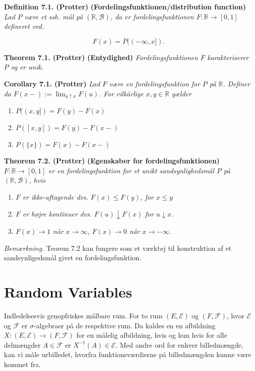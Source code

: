 \documentclass[
]{book}
\providecommand{\tightlist}{%
  \setlength{\itemsep}{0pt}\setlength{\parskip}{0pt}}
\begin{document}
\textbf{Definition 7.1. (Protter)} \textbf{(Fordelingsfunktionen/distribution function)} \emph{Lad \(P\) være et ssh. mål på \((\mathbb{R},\mathcal{B})\), da er fordelingsfunktionen \(F : \mathbb{R}\to [0,1]\) defineret ved.}

\[
F(x)=P((-\infty,x]).
\]

\textbf{Theorem 7.1. (Protter)} \textbf{(Entydighed)} \emph{Fordelingsfunktionen \(F\) karakteriserer \(P\) og er unik.}

\textbf{Corollary 7.1. (Protter)} \emph{Lad \(F\) være en fordelingsfunktion for \(P\) på \(\mathbb{R}\). Definer da \(F(x-):=\lim_{u\uparrow x}F(u)\). For vilkårlige \(x,y\in\mathbb{R}\) gælder}

\begin{enumerate}
\def\labelenumi{\roman{enumi}.}
\tightlist
\item
  \(P((x,y])=F(y)-F(x)\)
\item
  \(P([x,y])=F(y)-F(x-)\)
\item
  \(P(\{x\})=F(x)-F(x-)\)
\end{enumerate}

\textbf{Theorem 7.2. (Protter)} \textbf{(Egenskaber for fordelingsfunktionen)} \emph{\(F : \mathbb{R} \to [0,1]\) er en fordelingsfunktion for et unikt sandsynlighedsmål \(P\) på \((\mathbb{R},\mathcal{B})\), hvis}

\begin{enumerate}
\def\labelenumi{\roman{enumi}.}
\tightlist
\item
  \emph{\(F\) er ikke-aftagende dvs. \(F(x)\le F(y)\), for \(x\le y\)}
\item
  \emph{\(F\) er højre kontinuer dvs. \(F(u)\downarrow F(x)\) for \(u\downarrow x\).}
\item
  \emph{\(F(x)\to 1\) når \(x\to \infty\), \(F(x)\to 0\) når \(x\to -\infty\).}
\end{enumerate}

\emph{Bemærkning.} Teorem 7.2 kan fungere som et værktøj til konstruktion af et sandsynligedsmål givet en fordelingsfunktion.

\hypertarget{random-variables}{%
\section{Random Variables}\label{random-variables}}

Indledelsesvis genopfriskes målbare rum. For to rum \((E,\mathcal{E})\) og \((F,\mathcal{F})\), hvor \(\mathcal{E}\) og \(\mathcal{F}\) er \(\sigma\)-algebraer på de respektive rum. Da kaldes en en afbildning \(X : (E,\mathcal{E})\to(F,\mathcal{F})\) for en målelig afbildning, hvis og kun hvis for alle delmængder \(A\in\mathcal{F}\) er \(X^{-1}(A)\in\mathcal{E}\). Med andre ord for enhver billedmængde, kan vi måle urbilledet, hvorfra funktionsværdierne på billedmængden kunne være kommet fra.
\end{document}
